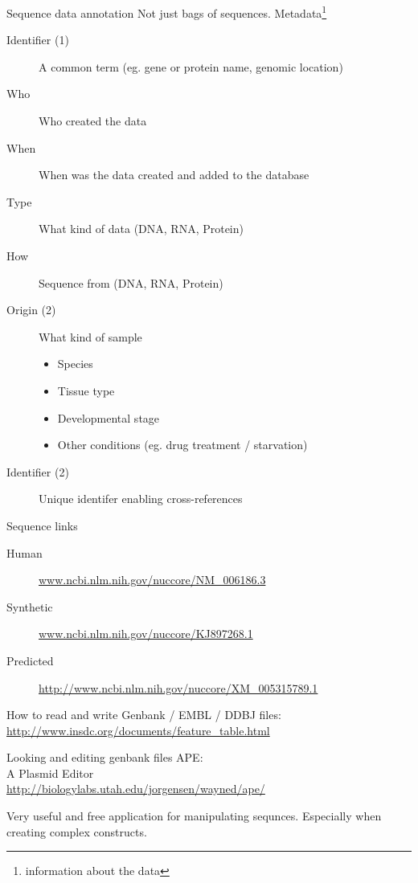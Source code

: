 \documentclass[pdf]{beamer}
\begin{document}
\begin{frame}{Sequence data annotation}
  Not just bags of sequences.
  \pause
  Metadata\footnote{information about the data}
  \pause
  \vspace{-2ex}
  \small
  \begin{description}
  \item[Identifier (1)] A common term (eg. gene or protein name, genomic location)
  \item[Who] Who created the data
  \item[When] When was the data created and added to the database
  \item[Type] What kind of data (DNA, RNA, Protein)
  \item[How] Sequence from (DNA, RNA, Protein)
  \item[Origin (2)] What kind of sample
    \begin{itemize}
    \item Species
    \item Tissue type
    \item Developmental stage
    \item Other conditions (eg. drug treatment / starvation)
    \end{itemize}
  \item[Identifier (2)] Unique identifer enabling cross-references
  \end{description}
  
\end{frame}

\begin{frame}{Sequence links}
  {\small
  \begin{description}
    \item[Human] \href{http://www.ncbi.nlm.nih.gov/nuccore/NM_006186.3}{www.ncbi.nlm.nih.gov/nuccore/NM\_006186.3}
    \item[Synthetic] \href{http://www.ncbi.nlm.nih.gov/nuccore/KJ897268.1}{www.ncbi.nlm.nih.gov/nuccore/KJ897268.1}
    \item[Predicted] \href{http://www.ncbi.nlm.nih.gov/nuccore/XM_005315789.1}{http://www.ncbi.nlm.nih.gov/nuccore/XM\_005315789.1}
  \end{description}
  }
  
  How to read and write Genbank / EMBL / DDBJ files:\\
  \url{http://www.insdc.org/documents/feature_table.html}
\end{frame}

\begin{frame}{Looking and editing genbank files}
  APE:\\
  A Plasmid Editor\\
  \url{http://biologylabs.utah.edu/jorgensen/wayned/ape/}

  Very useful and free application for manipulating sequnces.
  Especially when creating complex constructs.
\end{frame}
\end{document}
